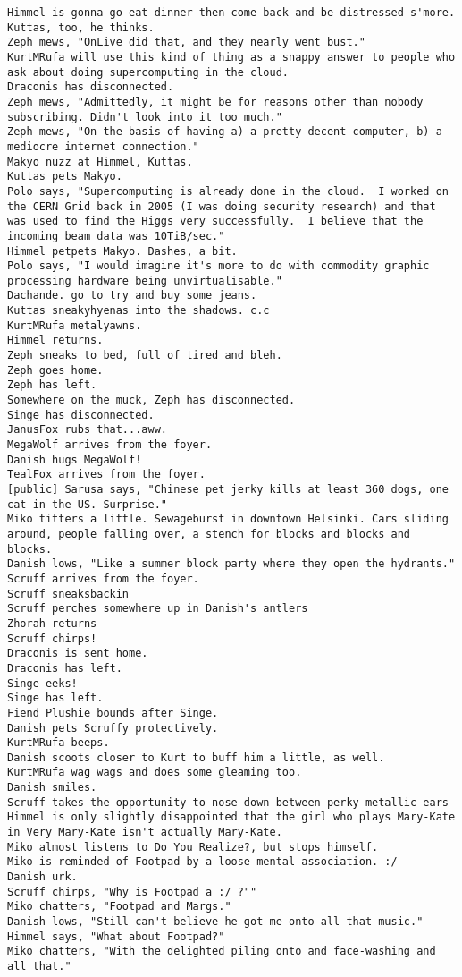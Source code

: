 \begin{verbatim}
Himmel is gonna go eat dinner then come back and be distressed s'more.
Kuttas, too, he thinks.
Zeph mews, "OnLive did that, and they nearly went bust."
KurtMRufa will use this kind of thing as a snappy answer to people who ask about doing supercomputing in the cloud.
Draconis has disconnected.
Zeph mews, "Admittedly, it might be for reasons other than nobody subscribing. Didn't look into it too much."
Zeph mews, "On the basis of having a) a pretty decent computer, b) a mediocre internet connection."
Makyo nuzz at Himmel, Kuttas.
Kuttas pets Makyo.
Polo says, "Supercomputing is already done in the cloud.  I worked on the CERN Grid back in 2005 (I was doing security research) and that was used to find the Higgs very successfully.  I believe that the incoming beam data was 10TiB/sec."
Himmel petpets Makyo. Dashes, a bit.
Polo says, "I would imagine it's more to do with commodity graphic processing hardware being unvirtualisable."
Dachande. go to try and buy some jeans.
Kuttas sneakyhyenas into the shadows. c.c
KurtMRufa metalyawns.
Himmel returns.
Zeph sneaks to bed, full of tired and bleh.
Zeph goes home.
Zeph has left.
Somewhere on the muck, Zeph has disconnected.
Singe has disconnected.
JanusFox rubs that...aww.
MegaWolf arrives from the foyer.
Danish hugs MegaWolf!
TealFox arrives from the foyer.
[public] Sarusa says, "Chinese pet jerky kills at least 360 dogs, one cat in the US. Surprise."
Miko titters a little. Sewageburst in downtown Helsinki. Cars sliding around, people falling over, a stench for blocks and blocks and blocks.
Danish lows, "Like a summer block party where they open the hydrants."
Scruff arrives from the foyer.
Scruff sneaksbackin
Scruff perches somewhere up in Danish's antlers
Zhorah returns
Scruff chirps!
Draconis is sent home.
Draconis has left.
Singe eeks!
Singe has left.
Fiend Plushie bounds after Singe.
Danish pets Scruffy protectively.
KurtMRufa beeps.
Danish scoots closer to Kurt to buff him a little, as well.
KurtMRufa wag wags and does some gleaming too.
Danish smiles.
Scruff takes the opportunity to nose down between perky metallic ears
Himmel is only slightly disappointed that the girl who plays Mary-Kate in Very Mary-Kate isn't actually Mary-Kate.
Miko almost listens to Do You Realize?, but stops himself.
Miko is reminded of Footpad by a loose mental association. :/
Danish urk.
Scruff chirps, "Why is Footpad a :/ ?""
Miko chatters, "Footpad and Margs."
Danish lows, "Still can't believe he got me onto all that music."
Himmel says, "What about Footpad?"
Miko chatters, "With the delighted piling onto and face-washing and all that."

\end{verbatim}
